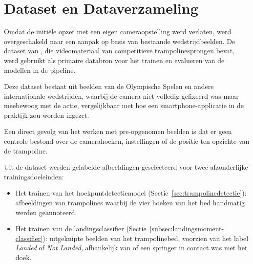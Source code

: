 
\section{Dataset en Dataverzameling}
\label{sec:dataset}

Omdat de initiële opzet met een eigen cameraopstelling werd verlaten, werd overgeschakeld naar een aanpak op basis van bestaande wedstrijdbeelden. De dataset van \textcite{Lin2025}, die videomateriaal van competitieve trampolinesprongen bevat, werd gebruikt als primaire databron voor het trainen en evalueren van de modellen in de pipeline.

Deze dataset bestaat uit beelden van de Olympische Spelen en andere internationale wedstrijden, waarbij de camera niet volledig gefixeerd was maar meebewoog met de actie, vergelijkbaar met hoe een smartphone-applicatie in de praktijk zou worden ingezet.

Een direct gevolg van het werken met pre-opgenomen beelden is dat er geen controle bestond over de camerahoeken, instellingen of de positie ten opzichte van de trampoline.

Uit de dataset werden gelabelde afbeeldingen geselecteerd voor twee afzonderlijke trainingsdoeleinden:
\begin{itemize}
    \item Het trainen van het hoekpuntdetectiemodel (Sectie~\ref{sec:trampolinedetectie}): afbeeldingen van trampolines waarbij de vier hoeken van het bed handmatig werden geannoteerd.
    \item Het trainen van de landingsclassifier (Sectie~\ref{subsec:landingsmoment-classifier}): uitgeknipte beelden van het trampolinebed, voorzien van het label \textit{Landed} of \textit{Not Landed}, afhankelijk van of een springer in contact was met het doek.
\end{itemize}
